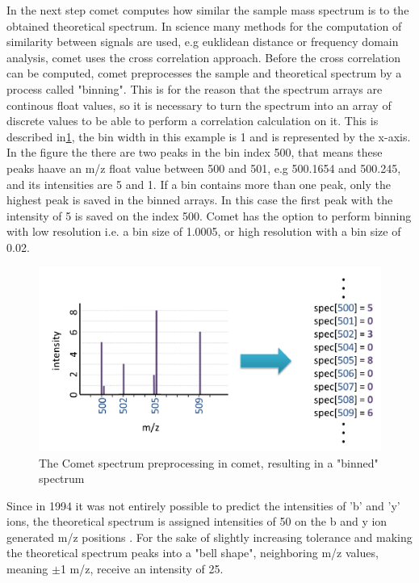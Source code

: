 \documentclass[11pt]{article}
\begin{document}
In the next step comet computes how similar the sample mass spectrum is to the obtained theoretical spectrum. In science many methods for the computation of similarity between signals are used, e.g euklidean distance or frequency domain analysis, comet uses the cross correlation approach. Before the cross correlation can be computed, comet preprocesses the sample and theoretical spectrum by a process called "binning". This is for the reason that the spectrum arrays are continous float values, so it is necessary to turn the spectrum into an array of discrete values to be able to perform a correlation calculation on it. This is described in\cref{fig:binning}, the bin width in this example is 1 and is represented by the x-axis. In the figure the there are two peaks in the bin index 500, that means these peaks haave an m/z float value between 500 and 501, e.g 500.1654 and 500.245, and its intensities are 5 and 1. If a bin contains more than one peak, only the highest peak is saved in the binned arrays. In this case the first peak with the intensity of 5 is saved on the index 500. Comet has the option to perform binning with low resolution i.e. a bin size of 1.0005, or high resolution with a bin size of 0.02. 
\begin{figure}[ht]
\centering
\includegraphics[width=1\textwidth]{figs/binning.png}
\caption{The Comet spectrum preprocessing in comet, resulting in a "binned" spectrum \cite{deeper-look-into-comet}}
\label{fig:binning}
\end{figure}
Since in 1994 it was not entirely possible to predict the intensities of 'b' and 'y' ions, the theoretical spectrum is assigned intensities of 50 on the b and y ion generated m/z positions \cite{deeper-look-into-comet}. For the sake of slightly increasing tolerance and making the theoretical spectrum peaks into a "bell shape", neighboring m/z values, meaning $\pm$1 m/z, receive an intensity of 25. 
\end{document}
